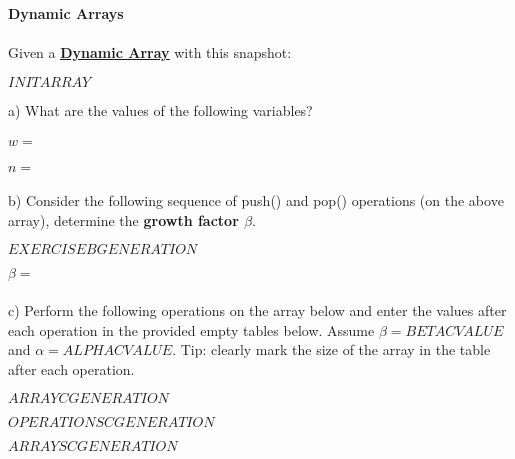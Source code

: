 \textbf{\LARGE{\color{tumgadPurple}Dynamic Arrays}}\\
\\
\noindent
Given a \href{https://sebastianoner.github.io/TUMGAD/src/DataStructures/Sequences/Arrays/Arrays}{\textbf{\underline{Dynamic Array}}} with this snapshot:
\begin{center}
    $INITARRAY$
\end{center}
a) What are the values of the following variables?\\
\\
$w = $\\
\\
$n = $\\
\\
b) Consider the following sequence of push() and pop() operations (on the above array), determine the \textbf{growth factor $\beta$}.
\begin{center}
    $EXERCISEBGENERATION$
\end{center}
$\beta = $\\
\\
c) Perform the following operations on the array below and enter the values after each operation in the provided empty
tables below. Assume $\beta = BETACVALUE$ and $\alpha = ALPHACVALUE$. Tip: clearly mark the size of the array in the table after each operation.
\begin{center}
    $ARRAYCGENERATION$
\end{center}
$OPERATIONSCGENERATION$
\begin{center}
    $ARRAYSCGENERATION$
\end{center}
